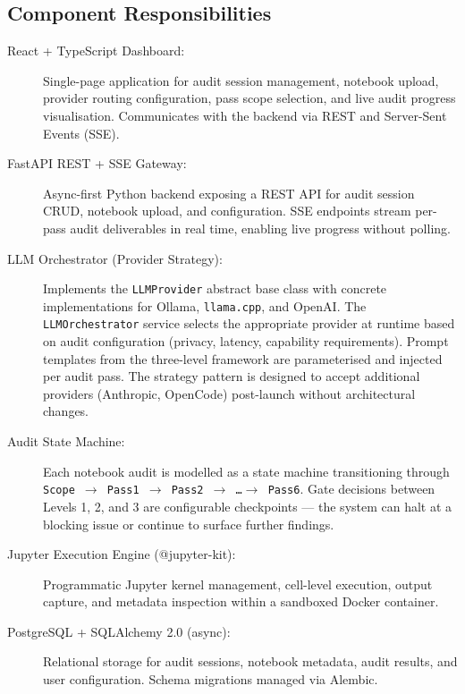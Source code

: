 \documentclass[11pt, a4paper]{article}
\begin{document}
\subsection*{Component Responsibilities}

\begin{description}
  \item[React + TypeScript Dashboard:] Single-page application for audit
    session management, notebook upload, provider routing configuration,
    pass scope selection, and live audit progress visualisation. Communicates
    with the backend via REST and Server-Sent Events (SSE).

  \item[FastAPI REST + SSE Gateway:] Async-first Python backend exposing a
    REST API for audit session CRUD, notebook upload, and configuration. SSE
    endpoints stream per-pass audit deliverables in real time, enabling live
    progress without polling.

  \item[LLM Orchestrator (Provider Strategy):] Implements the
    \texttt{LLMProvider} abstract base class with concrete implementations for
    Ollama, \texttt{llama.cpp}, and OpenAI. The \texttt{LLMOrchestrator}
    service selects the appropriate provider at runtime based on audit
    configuration (privacy, latency, capability requirements). Prompt
    templates from the three-level framework are parameterised and injected
    per audit pass. The strategy pattern is designed to accept additional
    providers (Anthropic, OpenCode) post-launch without architectural changes.

  \item[Audit State Machine:] Each notebook audit is modelled as a state
    machine transitioning through \texttt{Scope $\rightarrow$ Pass1
    $\rightarrow$ Pass2 $\rightarrow$ \ldots $\rightarrow$ Pass6}. Gate
    decisions between Levels 1, 2, and 3 are configurable checkpoints — the
    system can halt at a blocking issue or continue to surface further
    findings.

  \item[Jupyter Execution Engine (@jupyter-kit):] Programmatic Jupyter kernel
    management, cell-level execution, output capture, and metadata inspection
    within a sandboxed Docker container.

  \item[PostgreSQL + SQLAlchemy 2.0 (async):] Relational storage for audit
    sessions, notebook metadata, audit results, and user configuration. Schema
    migrations managed via Alembic.
\end{description}
\end{document}
